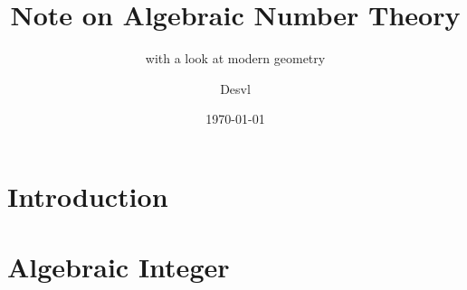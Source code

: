 \documentclass[en]{elegantbook}
\title{Note on Algebraic Number Theory}
\subtitle{with a look at modern geometry}
\date{\today}
\institute{The Internet}
\author{Desvl}
\begin{document}
	\maketitle
	\tableofcontents
	\chapter*{Introduction}
	\chapter{Algebraic Integer}
\end{document}
